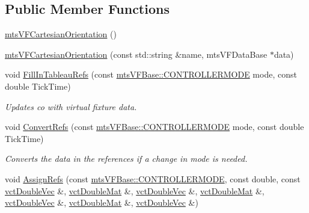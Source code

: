 \subsection*{Public Member Functions}
\begin{DoxyCompactItemize}
\item 
\hyperlink{classmts_v_f_cartesian_orientation_a1682f34e52c864a10d761f187fbeb4a4}{mts\+V\+F\+Cartesian\+Orientation} ()
\item 
\hyperlink{classmts_v_f_cartesian_orientation_afdf64942e810ea8a2dea4721673fa8e5}{mts\+V\+F\+Cartesian\+Orientation} (const std\+::string \&name, mts\+V\+F\+Data\+Base $\ast$data)
\item 
void \hyperlink{classmts_v_f_cartesian_orientation_a80dfa0f85f6f140b27bda5542580e5b9}{Fill\+In\+Tableau\+Refs} (const \hyperlink{classmts_v_f_base_a742dd08f8b70bafeb746cec14d9ee974}{mts\+V\+F\+Base\+::\+C\+O\+N\+T\+R\+O\+L\+L\+E\+R\+M\+O\+D\+E} mode, const double Tick\+Time)
\begin{DoxyCompactList}\small\item\em Updates co with virtual fixture data. \end{DoxyCompactList}\item 
void \hyperlink{classmts_v_f_cartesian_orientation_a4cde57769f67efae868f3478f254d7d8}{Convert\+Refs} (const \hyperlink{classmts_v_f_base_a742dd08f8b70bafeb746cec14d9ee974}{mts\+V\+F\+Base\+::\+C\+O\+N\+T\+R\+O\+L\+L\+E\+R\+M\+O\+D\+E} mode, const double Tick\+Time)
\begin{DoxyCompactList}\small\item\em Converts the data in the references if a change in mode is needed. \end{DoxyCompactList}\item 
void \hyperlink{classmts_v_f_cartesian_orientation_a96a3833d5bc6b1e9845c71046b9ee088}{Assign\+Refs} (const \hyperlink{classmts_v_f_base_a742dd08f8b70bafeb746cec14d9ee974}{mts\+V\+F\+Base\+::\+C\+O\+N\+T\+R\+O\+L\+L\+E\+R\+M\+O\+D\+E}, const double, const \hyperlink{vct_dynamic_vector_types_8h_ade4b3068c86fb88f41af2e5187e491c2}{vct\+Double\+Vec} \&, \hyperlink{vct_dynamic_matrix_types_8h_a48f1eb2461d20a99e824ee5753a37c84}{vct\+Double\+Mat} \&, \hyperlink{vct_dynamic_vector_types_8h_ade4b3068c86fb88f41af2e5187e491c2}{vct\+Double\+Vec} \&, \hyperlink{vct_dynamic_matrix_types_8h_a48f1eb2461d20a99e824ee5753a37c84}{vct\+Double\+Mat} \&, \hyperlink{vct_dynamic_vector_types_8h_ade4b3068c86fb88f41af2e5187e491c2}{vct\+Double\+Vec} \&, \hyperlink{vct_dynamic_matrix_types_8h_a48f1eb2461d20a99e824ee5753a37c84}{vct\+Double\+Mat} \&, \hyperlink{vct_dynamic_vector_types_8h_ade4b3068c86fb88f41af2e5187e491c2}{vct\+Double\+Vec} \&)
\end{DoxyCompactItemize}
